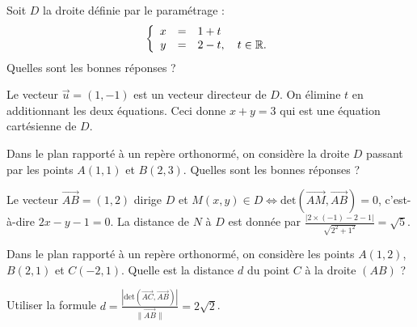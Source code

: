 \begin{question}

Soit $D$ la droite définie par le paramétrage :
$$\left\{\begin{array}{ccl}x&=&1+t\\ y&=&2-t,\quad t\in \mathbb{R}.
\end{array}\right.$$
Quelles sont les bonnes réponses ?
\begin{answers}  
\end{answers}
\begin{explanations}
Le vecteur $\vec{u}=(1,-1)$ est un vecteur directeur de $D$. On élimine $t$ en additionnant les deux équations. Ceci donne $x+y=3$ qui est une équation cartésienne de $D$.
\end{explanations}
\end{question}



\begin{question}

Dans le plan rapporté à un repère orthonormé, on considère la droite $D$ passant par les points $A(1,1)$ et $B(2,3)$. Quelles sont les bonnes réponses ?
\begin{answers}  
\end{answers}
\begin{explanations}
Le vecteur $\overrightarrow{AB}=(1,2)$ dirige $D$ et $M(x,y)\in D\Leftrightarrow \mbox{det} \left(\overrightarrow{AM},\overrightarrow{AB}\right)=0$, c'est-à-dire $2x-y-1=0$. La distance de $N$ à $D$ est donnée par $\displaystyle \frac{|2\times (-1)-2-1|}{\sqrt{2^2+1^2}}=\sqrt{5}$.
\end{explanations}
\end{question}






\begin{question}

Dans le plan rapporté à un repère orthonormé, on considère les points $\displaystyle A(1,2)$, $B(2,1)$ et $C(-2,1)$. Quelle est la distance $d$ du point $C$ à la droite $(AB)$ ?
\begin{answers}  
\end{answers}
\begin{explanations}
Utiliser la formule $\displaystyle d=\frac{\left|\mbox{det}\left(\overrightarrow{AC},\overrightarrow{AB}\right)\right|}{\|\overrightarrow{AB}\|}=2\sqrt{2}$.
\end{explanations}
\end{question}


